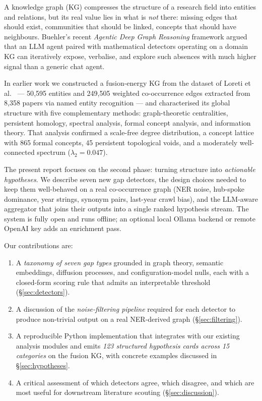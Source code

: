 \documentclass[11pt,a4paper]{article}
\begin{document}
A knowledge graph (KG) compresses the structure of a research field into entities and relations, but its real value lies in what is \emph{not} there: missing edges that should exist, communities that should be linked, concepts that should have neighbours. Buehler's recent \emph{Agentic Deep Graph Reasoning} framework \citep{buehler2025agentic} argued that an LLM agent paired with mathematical detectors operating on a domain KG can iteratively expose, verbalise, and explore such absences with much higher signal than a generic chat agent.

In earlier work we constructed a fusion-energy KG from the dataset of Loreti et al.\ \citep{loreti2025} --- 50{,}595 entities and 249{,}505 weighted co-occurrence edges extracted from 8{,}358 papers via named entity recognition --- and characterised its global structure with five complementary methods: graph-theoretic centralities, persistent homology, spectral analysis, formal concept analysis, and information theory. That analysis confirmed a scale-free degree distribution, a concept lattice with 865 formal concepts, 45 persistent topological voids, and a moderately well-connected spectrum ($\lambda_2=0.047$).

The present report focuses on the second phase: turning structure into \emph{actionable hypotheses}. We describe seven new gap detectors, the design choices needed to keep them well-behaved on a real co-occurrence graph (NER noise, hub-spoke dominance, year strings, synonym pairs, last-year crawl bias), and the LLM-aware aggregator that joins their outputs into a single ranked hypothesis stream. The system is fully open and runs offline; an optional local Ollama backend or remote OpenAI key adds an enrichment pass.

Our contributions are:
\begin{enumerate}
\item A \emph{taxonomy of seven gap types} grounded in graph theory, semantic embeddings, diffusion processes, and configuration-model nulls, each with a closed-form scoring rule that admits an interpretable threshold (\S\ref{sec:detectors}).
\item A discussion of the \emph{noise-filtering pipeline} required for each detector to produce non-trivial output on a real NER-derived graph (\S\ref{sec:filtering}).
\item A reproducible Python implementation that integrates with our existing analysis modules and emits \emph{123 structured hypothesis cards across 15 categories} on the fusion KG, with concrete examples discussed in \S\ref{sec:hypotheses}.
\item A critical assessment of which detectors agree, which disagree, and which are most useful for downstream literature scouting (\S\ref{sec:discussion}).
\end{enumerate}
\end{document}

